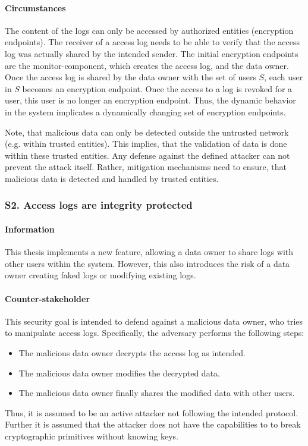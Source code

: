 \documentclass[../main.tex]{subfiles}
\begin{document}
\paragraph{Circumstances}
The content of the logs can only be accessed by authorized entities (encryption endpoints).
The receiver of a access log needs to be able to verify that the access log was actually shared by the intended sender. 
The initial encryption endpoints are the monitor-component, which creates the access log, and the data owner.
Once the access log is shared by the data owner with the set of users $S$, each user in $S$ becomes an encryption endpoint.
Once the access to a log is revoked for a user, this user is no longer an encryption endpoint.
Thus, the dynamic behavior in the system implicates a dynamically changing set of encryption endpoints.

Note, that malicious data can only be detected outside the untrusted network (e.g. within trusted entities).
This implies, that the validation of data is done within these trusted entities. 
Any defense against the defined attacker can not prevent the attack itself.
Rather, mitigation mechanisms need to ensure, that malicious data is detected and handled by trusted entities.

\subsubsection{S2. Access logs are integrity protected}

\paragraph{Information}
This thesis implements a new feature, allowing a data owner to share logs with other users within the system.
However, this also introduces the risk of a data owner creating faked logs or modifying existing logs.
       
\paragraph{Counter-stakeholder}
This security goal is intended to defend against a malicious data owner, who tries to manipulate access logs. 
Specifically, the adversary performs the following steps:
\begin{itemize}
    \item The malicious data owner decrypts the access log as intended.
    \item The malicious data owner modifies the decrypted data.
    \item The malicious data owner finally shares the modified data with other users.
\end{itemize}
Thus, it is assumed to be an active attacker not following the intended protocol.
Further it is assumed that the attacker does not have the capabilities to to break cryptographic primitives without knowing keys.
\end{document}
